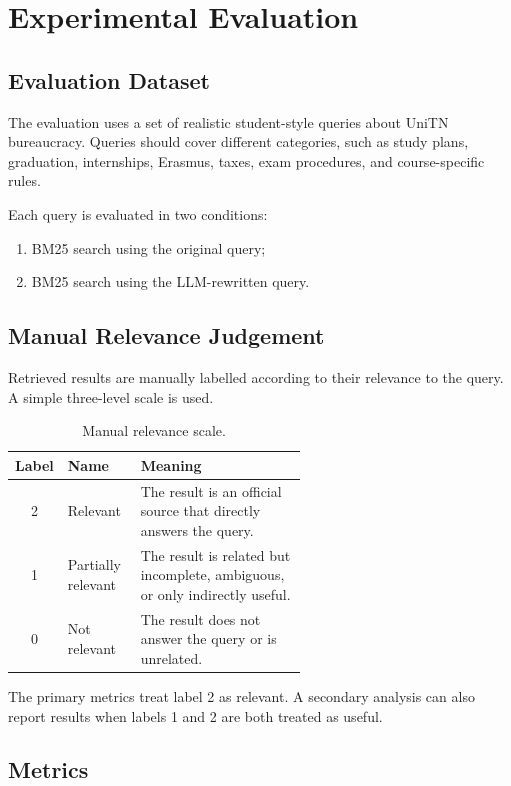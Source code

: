 \chapter{Experimental Evaluation}

\section{Evaluation Dataset}
The evaluation uses a set of realistic student-style queries about UniTN bureaucracy. Queries should cover different categories, such as study plans, graduation, internships, Erasmus, taxes, exam procedures, and course-specific rules.

Each query is evaluated in two conditions:

\begin{enumerate}
    \item BM25 search using the original query;
    \item BM25 search using the LLM-rewritten query.
\end{enumerate}

\section{Manual Relevance Judgement}
Retrieved results are manually labelled according to their relevance to the query. A simple three-level scale is used.

\begin{table}[h]
\centering
\begin{tabular}{clp{0.58\linewidth}}
\toprule
\textbf{Label} & \textbf{Name} & \textbf{Meaning} \\
\midrule
2 & Relevant & The result is an official source that directly answers the query. \\
1 & Partially relevant & The result is related but incomplete, ambiguous, or only indirectly useful. \\
0 & Not relevant & The result does not answer the query or is unrelated. \\
\bottomrule
\end{tabular}
\caption{Manual relevance scale.}
\label{tab:relevance-scale}
\end{table}

The primary metrics treat label 2 as relevant. A secondary analysis can also report results when labels 1 and 2 are both treated as useful.

\section{Metrics}

